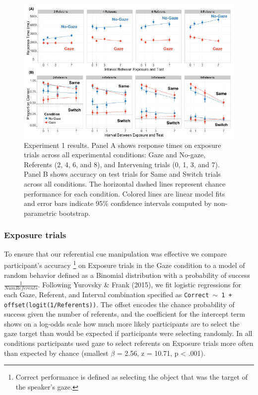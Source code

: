 \documentclass[authoryear, review]{elsarticle}
\newenvironment{CodeChunk}{}{}
\begin{document}
\begin{CodeChunk}
\begin{figure}[tb]
\includegraphics{figs/expt1-plot-1} \caption[Experiment 1 results]{Experiment 1 results. Panel A shows response times on exposure trials across all experimental conditions: Gaze and No-gaze, Referents (2, 4, 6, and 8), and Intervening trials (0, 1, 3, and 7). Panel B shows accuracy on test trials for Same and Switch trials across all conditions. The horizontal dashed lines represent chance performance for each condition. Colored lines are linear model fits and error bars indicate 95\% confidence intervals computed by non-parametric bootstrap.}\label{fig:expt1-plot}
\end{figure}
\end{CodeChunk}

\subsubsection{Exposure trials}\label{exposure-trials}

To ensure that our referential cue manipulation was effective we compare
participant's accuracy
\footnote{Correct performance is defined as selecting the object that was the target of the speaker's gaze.}
on Exposure trials in the Gaze condition to a model of random behavior
defined as a Binomial distribution with a probability of success
\(\frac{1}{Num Referents}\). Following Yurovsky \& Frank (2015), we fit
logistic regressions for each Gaze, Referent, and Interval combination
specified as \texttt{Correct $\sim$ 1 + offset(logit(1/Referents))}. The
offset encodes the chance probability of success given the number of
referents, and the coefficient for the intercept term shows on a
log-odds scale how much more likely participants are to select the gaze
target than would be expected if participants were selecting randomly.
In all conditions participants used gaze to select referents on Exposure
trials more often than expected by chance (smallest \(\beta\) = 2.56, z
= 10.71, p \textless{} .001).
\end{document}
